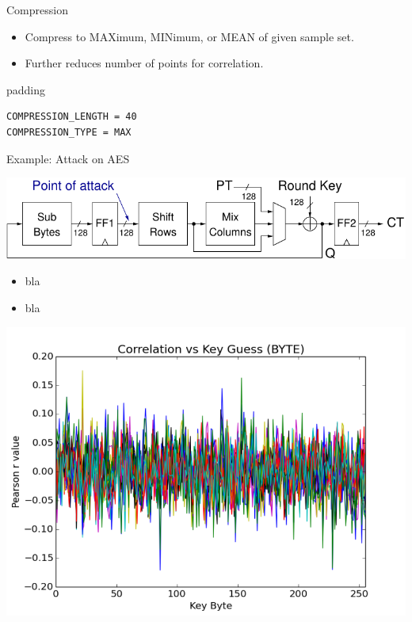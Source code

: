 \documentclass[final]{beamer}
\begin{document}
\begin{frame}[fragile]{}
\begin{columns}[t]
\begin{column}{.31\linewidth}
\begin{block}{Compression}
\begin{minipage}[t]{0.49\linewidth}
          \vspace{-8cm}%
         \begin{itemize}
           \item Compress to MAXimum, MINimum, or MEAN of given sample set.
           \item Further reduces number of points for correlation.
         \end{itemize} 
          \begin{center}
            \begin{beamercolorbox}[rounded=true]{padding}%
               \footnotesize%
              \begin{lstlisting}
COMPRESSION_LENGTH = 40
COMPRESSION_TYPE = MAX
              \end{lstlisting}
            \end{beamercolorbox}
          \end{center}
        \end{minipage}
       \end{block}
       \begin{block}{Example: Attack on AES}
         \begin{center}
           \includegraphics[width=0.9\linewidth]{../figures/aes128}
         \end{center}
         \begin{itemize}
           \item bla
           \item bla
         \end{itemize} 
        \begin{minipage}[t]{0.49\linewidth}
           \includegraphics[width=0.9\linewidth]{../figures/pearson-r}

\end{minipage}
\end{block}
\end{column}
\end{columns}
\end{frame}
\end{document}
